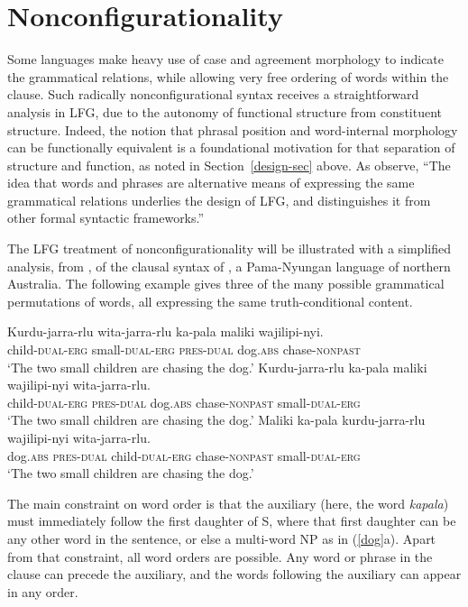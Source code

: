 \section{Nonconfigurationality}
\label{nonconfig-sec}
Some languages make heavy use of case and agreement morphology to indicate the grammatical relations, while allowing very free ordering of words within the clause.  Such radically nonconfigurational syntax receives a straightforward analysis in LFG, due to the autonomy of functional structure from constituent structure.  Indeed, the notion that phrasal position and word-internal morphology can be functionally equivalent is a foundational motivation for that separation of structure and function, as noted in Section~\ref{design-sec} above.  As \citet[5]{BATW2016a} observe, ``The idea that words and phrases are alternative means of expressing the
same grammatical relations underlies the design of LFG, and distinguishes it from other formal syntactic frameworks.''  

The LFG treatment of nonconfigurationality will be illustrated with a simplified analysis, from \citet[352--353]{BATW2016a}, of the clausal syntax of , a Pama-Nyungan language of northern Australia.  The following example gives three of the many possible grammatical permutations of words, all expressing the same truth-conditional content.

 \begin{exe} 
\ex	\label{dog}
\begin{xlist}
\ex 
\gll Kurdu-jarra-rlu wita-jarra-rlu ka-pala maliki wajilipi-nyi. \\
child-\textsc{dual-erg} small-\textsc{dual-erg} \textsc{pres-dual}
dog.\textsc{abs} chase-\textsc{nonpast}\\
\glt `The two small children are chasing the dog.' 
\ex 
\gll Kurdu-jarra-rlu ka-pala maliki wajilipi-nyi wita-jarra-rlu. \\
child-\textsc{dual-erg}  \textsc{pres-dual}
dog.\textsc{abs} chase-\textsc{nonpast} small-\textsc{dual-erg}\\
\glt `The two small children are chasing the dog.' 
\ex 
\gll Maliki ka-pala  kurdu-jarra-rlu wajilipi-nyi wita-jarra-rlu. \\
dog.\textsc{abs} \textsc{pres-dual} child-\textsc{dual-erg} chase-\textsc{nonpast} small-\textsc{dual-erg} 
\\
\glt `The two small children are chasing the dog.' 
\end{xlist}
\end{exe}
The main constraint on word order is that the auxiliary (here, the word \textit{kapala}) must immediately follow the first daughter of S, where that first daughter can be any other word in the sentence, or else a multi-word NP as in (\ref{dog}a).  Apart from that constraint, all word orders are possible.  Any word or phrase in the clause can precede the auxiliary, and the words following the auxiliary can appear in any order. 

